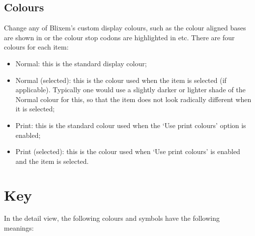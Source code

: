 \documentclass[letterpaper]{article}
\newcommand\liststyleWWviiiNumxx{%
\renewcommand\labelitemi{{\textbullet}}
\renewcommand\labelitemii{o}
\renewcommand\labelitemiii{[F0A7?]}
\renewcommand\labelitemiv{[F0B7?]}
}
\begin{document}
\bigskip

{\color[rgb]{0.30980393,0.5058824,0.7411765}\subsection[Appearance]{Colours}}
\hypertarget{RefHeading2621056909880}{}
Change any of Blixem{\textquoteright}s custom display colours, such as the colour aligned bases are shown in or the colour stop codons are highlighted in etc. There are four colours for each item:

\liststyleWWviiiNumxx
\begin{itemize}
\item {Normal: this is the standard display colour;}
\item {Normal (selected): this is the colour used when the item is selected (if applicable). Typically one would use a slightly darker or lighter shade of the Normal colour for this, so that the item does not look radically different when it is selected;}
\item {Print: this is the standard colour used when the {\textquoteleft}Use print colours{\textquoteright} option is enabled;}
\item {Print (selected): this is the colour used when {\textquoteleft}Use print colours{\textquoteright} is enabled and the item is selected. }
\end{itemize}

{\color[rgb]{0.0,0.27058825,0.5254902}\section[Key]{Key}}
\hypertarget{RefHeading2681056909880}{}{
In the detail view, the following colours and symbols have the following
meanings:}

\bigskip
\end{document}
